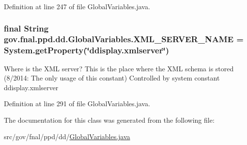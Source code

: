 Definition at line 247 of file Global\-Variables.\-java.

\hypertarget{classgov_1_1fnal_1_1ppd_1_1dd_1_1GlobalVariables_a1b1eb1c9096380d09b968cd474e8bb86}{
\subsubsection[{X\-M\-L\-\_\-\-S\-E\-R\-V\-E\-R\-\_\-\-N\-A\-M\-E}]{\setlength{\rightskip}{0pt plus 5cm}final String gov.\-fnal.\-ppd.\-dd.\-Global\-Variables.\-X\-M\-L\-\_\-\-S\-E\-R\-V\-E\-R\-\_\-\-N\-A\-M\-E = System.\-get\-Property(\char`\"{}ddisplay.\-xmlserver\char`\"{})\hspace{0.3cm}{\ttfamily [static]}}}\label{classgov_1_1fnal_1_1ppd_1_1dd_1_1GlobalVariables_a1b1eb1c9096380d09b968cd474e8bb86}
Where is the X\-M\-L server? This is the place where the X\-M\-L schema is stored (8/2014\-: The only usage of this constant) Controlled by system constant ddisplay.\-xmlserver 

Definition at line 291 of file Global\-Variables.\-java.



The documentation for this class was generated from the following file\-:\begin{DoxyCompactItemize}
\item 
src/gov/fnal/ppd/dd/\hyperlink{GlobalVariables_8java}{Global\-Variables.\-java}\end{DoxyCompactItemize}
